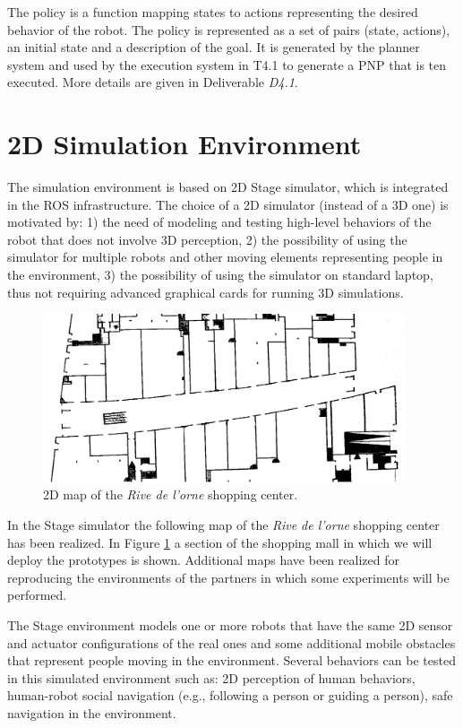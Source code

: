 \documentclass{article}
\begin{document}
The policy is a function mapping states to actions representing the desired behavior of the robot. The policy is represented as a set of pairs (state, actions), an initial state and a description of the goal. It is generated by the planner system and used by the execution system in T4.1 to generate a PNP that is ten executed.
More details are given in Deliverable \emph{D4.1}.



\section{2D Simulation Environment}

The simulation environment is based on 2D Stage simulator, which is integrated in the ROS infrastructure. The choice of a 2D simulator (instead of a 3D one) is motivated by: 1) the need of modeling and testing high-level behaviors of the robot that does not involve 3D perception, 2) the possibility of using the simulator for multiple robots and other moving elements representing people in the environment, 3) the possibility of using the simulator on standard laptop, thus not requiring advanced graphical cards for running 3D simulations.

\begin{figure}
\includegraphics[width=0.95\textwidth]{Rive1.png}
\caption{2D map of the \emph{Rive de l'orne} shopping center.}
\label{fig:stage}
\end{figure}


In the Stage simulator the following map of the \emph{Rive de l'orne} shopping center has been realized. In Figure \ref{fig:stage} a section of the shopping mall in which we will deploy the prototypes is shown.
Additional maps have been realized for reproducing the environments of the partners in which some experiments will be performed.

The Stage environment models one or more robots that have the same 2D sensor and actuator configurations of the real ones and some additional mobile obstacles that represent people moving in the environment. Several behaviors can be tested in this simulated environment such as: 2D perception of human behaviors, human-robot social navigation (e.g., following a person or guiding a person), safe navigation in the environment.
\end{document}
